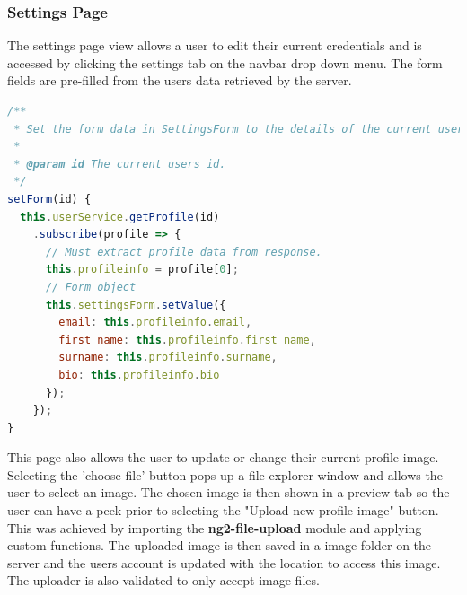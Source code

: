 \subsubsection{Settings Page}
The settings page view allows a user to edit their current credentials and is accessed by clicking the settings tab on the navbar drop down menu. The form fields are pre-filled from the users data retrieved by the server.

\begin{lstlisting}[language=JavaScript,caption={Auto fill form data},captionpos=b,label={fig:userscema}]
/**
 * Set the form data in SettingsForm to the details of the current user.
 * 
 * @param id The current users id.
 */
setForm(id) {
  this.userService.getProfile(id)
    .subscribe(profile => {
      // Must extract profile data from response.
      this.profileinfo = profile[0];
      // Form object
      this.settingsForm.setValue({
        email: this.profileinfo.email,
        first_name: this.profileinfo.first_name,
        surname: this.profileinfo.surname,
        bio: this.profileinfo.bio
      });
    });
}
\end{lstlisting}
 This page also allows the user to update or change their current profile image. Selecting the 'choose file' button pops up a file explorer window and allows the user to select an image. The chosen image is then shown in a preview tab so the user can have a peek prior to selecting the "Upload new profile image" button. This was achieved by importing the \textbf{ng2-file-upload} module and applying custom functions. The uploaded image is then saved in a image folder on the server and the users account is updated with the location to access this image. The uploader is also validated to only accept image files.
